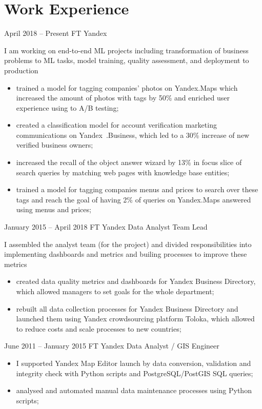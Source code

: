 \section{Work Experience}

\jobentry
    {April 2018 -- Present}
    {FT}
    {Yandex}
    {\currentPosition}
    {
        I am working on end-to-end ML projects including transformation of business problems to ML tasks, model training, quality assessment, and deployment to production
        \begin{itemize}
            \item trained a model for tagging companies' photos on Yandex.Maps which increased the amount of photos with tags by 50\% and enriched user experience using to A/B testing;
            \item created a classification model for account verification marketing communications on Yandex~.Business, which led to a 30\% increase of new verified business owners;
            \item increased the recall of the object answer wizard by 13\% in focus slice of search queries by matching web pages with knowledge base entities;
            \item trained a model for tagging companies menus and prices to search over these tags and reach the goal of having 2\% of queries on Yandex.Maps answered using menus and prices;
        \end{itemize}
    }

\hrulefill

\jobentry
    {January 2015 -- April 2018}
    {FT}
    {Yandex}
    {Data Analyst Team Lead}
    {
        I assembled the analyst team (for the project) and divided responsibilities into implementing dashboards and metrics and builing processes to improve these metrics 
        \begin{itemize}
            \item created data quality metrics and dashboards for Yandex Business Directory, which allowed managers to set goals for the whole department;
            \item rebuilt all data collection processes for Yandex Business Directory and launched them using Yandex crowdsourcing platform Toloka, which allowed to reduce costs and scale processes to new countries;
        \end{itemize}
    }

\hrulefill

\jobentry
    {June 2011 -- January 2015}
    {FT}
    {Yandex}
    {Data Analyst / GIS Engineer}
    {
        \begin{itemize}[topsep=0pt]
            \item I supported Yandex Map Editor launch by data conversion, validation and integrity check with Python scripts and PostgreSQL/PostGIS SQL queries;
            \item analysed and automated manual data maintenance processes using Python scripts;
        \end{itemize}
    }
